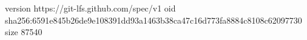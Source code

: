 version https://git-lfs.github.com/spec/v1
oid sha256:6591e845b26de9e108391dd93a1463b38ca47c16d773fa8884c8108c62097730
size 87540
